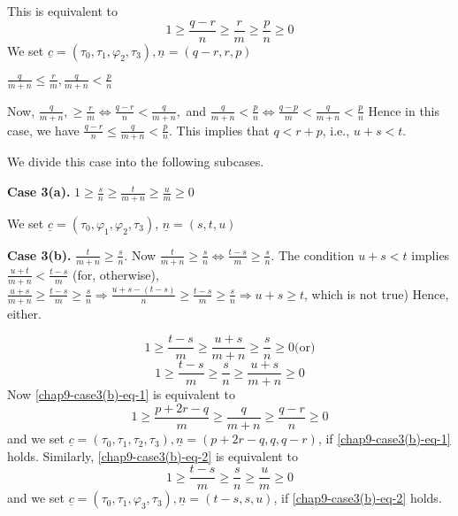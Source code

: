 This is equivalent to
$$
1 \geq \frac{q-r}{n} \geq \frac{r}{m} \geq \frac{p}{n} \geq 0
$$
We set $\underline{c}= (\tau_{0}, \tau_{1}, \varphi_{2}, \tau_{3}), \underline{n}= (q-r,r,p)$

\begin{case}\label{chap9-subsec8.3-case-3}
$\frac{q}{m+n} \leq \frac{r}{m}, \frac{q}{m+n} < \frac{p}{n}$

Now, $\frac{q}{m+n}, \geq \frac{r}{m} \Longleftrightarrow \frac{q-r}{n} < \frac{q}{m+n},$ and $\frac{q}{m+n} < \frac{p}{n} \Longleftrightarrow \frac{q-p}{m} < \frac{q}{m+n} < \frac{p}{n}$ Hence in this case, we have $\frac{q-r}{n} \leq \frac{q}{m+n} < \frac{p}{n}$. This implies that $ q< r+p$, i.e., $u+ s< t$.

We divide this case into the following subcases.
\end{case}

\noindent
{\bf Case 3(a).} $1 \geq \frac{s}{n} \geq \frac{t}{m+n}\geq \frac{u}{m} \geq 0$

We set $\underline{c}= (\tau_{0},\varphi_{1}, \varphi_{2},\tau_{3})$, $\underline{n}=(s,t,u)$

\smallskip
\noindent
{\bf Case 3(b).} $\frac{t}{m+n} \geq \frac{s}{n}$. Now $\frac{t}{m+n} \geq \frac{s}{n} \Longleftrightarrow \frac{t-s}{m} \geq \frac{s}{n}$. The condition $u + s< t$ implies $\frac{u+t}{m+n} < \frac{t-s}{m}$ (for, otherwise), $\frac{u+s}{m+n} \geq \frac{t-s}{m} \geq \frac{s}{n} \Rightarrow \frac{u+s-(t-s)}{n} \geq \frac{t-s}{m} \geq \frac{s}{n} \Rightarrow u+s \geq t$, which is not true) Hence, either.


\begin{equation*}\label{chap9-case3(b)-eq-1}
1 \geq \frac{t-s}{m} \geq \frac{u+s}{m+n} \geq \frac{s}{n} \geq 0 \text{(or)}\tag{1}
\end{equation*}
\begin{equation*}\label{chap9-case3(b)-eq-2}
1 \geq \frac{t-s}{m} \geq \frac{s}{n} \geq \frac{u+s}{m+n} \geq 0\tag{2}
\end{equation*}
Now \eqref{chap9-case3(b)-eq-1} is equivalent to
$$
1 \geq \frac{p+2r-q}{m} \geq \frac{q}{m+n} \geq \frac{q-r}{n} \geq 0
$$
and we set $\underline{c}= (\tau_{0}, \tau_{1}, \tau_{2},\tau_{3}), \underline{n}=(p+2r-q, q, q-r)$,
if \eqref{chap9-case3(b)-eq-1} holds. Similarly, \eqref{chap9-case3(b)-eq-2} is equivalent to
$$
1 \geq \frac{t-s}{m} \geq \frac{s}{n} \geq \frac{u}{m} \geq 0
$$
and we set $\underline{c}= (\tau_{0}, \tau_{1},\varphi_{3}, \tau_{3}), \underline{n}=(t-s,s,u)$,
if \eqref{chap9-case3(b)-eq-2} holds.

